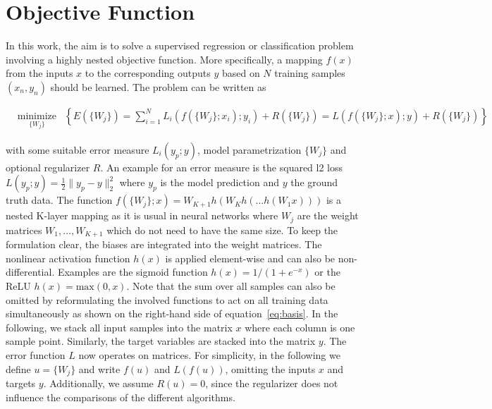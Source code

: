 \documentclass[english,11pt,a4paper]{article}
\begin{document}

\section{Objective Function}

In this work, the aim is to solve a supervised regression or classification problem involving a highly nested objective function. More specifically, a mapping $f(x)$ from the inputs $x$ to the corresponding outputs $y$ based on $N$ training samples $(x_n, y_n)$ should be learned. The problem can be written as

\begin{equation}
	\begin{aligned}
		& \underset{\{W_j\}}{\text{minimize}}
		& \left\{ E(\{W_j\}) = \sum_{i=1}^{N} L_i(f(\{W_j\};x_i);y_i) + R(\{W_j\})
		= L(f(\{W_j\};x);y) + R(\{W_j\}) \right\}
	\end{aligned}
	\label{eq:basis}
\end{equation}

with some suitable error measure $L_i(y_p;y)$, model parametrization $\{W_j\}$ and optional regularizer $R$. An example for an error measure is the squared l2 loss $L(y_p;y) = \frac{1}{2} \| y_p - y \|^2_2$ where $y_p$ is the model prediction and $y$ the ground truth data. The function $f(\{W_j\};x) = W_{K+1}h(W_Kh(\dots h(W_1x)))$ is a nested K-layer mapping as it is usual in neural networks where $W_j$ are the weight matrices $W_1,\dots,W_{K+1}$ which do not need to have the same size. To keep the formulation clear, the biases are integrated into the weight matrices. The nonlinear activation function $h(x)$ is applied element-wise and can also be non-differential. Examples are the sigmoid function $h(x) = 1/(1 + e^{-x})$ or the ReLU $h(x) = \mathrm{max}(0, x)$. Note that the sum over all samples can also be omitted by reformulating the involved functions to act on all training data simultaneously as shown on the right-hand side of equation~\ref{eq:basis}. In the following, we stack all input samples into the matrix $x$ where each column is one sample point. Similarly, the target variables are stacked into the matrix $y$. The error function $L$ now operates on matrices. For simplicity, in the following we define $u = \{W_j\}$ and write $f(u)$ and $L(f(u))$, omitting the inputs $x$ and targets $y$. Additionally, we assume $R(u) = 0$, since the regularizer does not influence the comparisons of the different algorithms.
\end{document}
